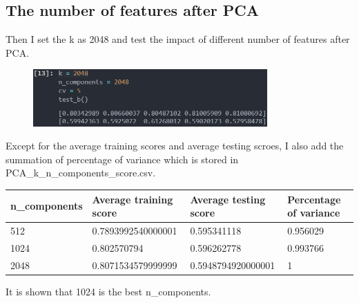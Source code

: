 \documentclass[UTF8, a4paper, 11pt]{article}
\begin{document}
\subsection{The number of features after PCA}
Then I set the k as 2048 and test the impact of different number of features after PCA.
\begin{figure}[H]
    \centering
    \includegraphics[width=0.8\textwidth]{n_components.png}
\end{figure}
Except for the average training scores and average testing scroes, I also add the summation of percentage of variance which is stored in PCA\_k\_n\_components\_score.csv.
\begin{table}[H]
    \center
\begin{tabular}{|l|l|l|l|}
\hline
n\_components & Average training score & Average testing score & Percentage of variance \\ \hline
512          & 0.7893992540000001     & 0.595341118           & 0.956029               \\ \hline
1024         & 0.802570794            & 0.596262778           & 0.993766               \\ \hline
2048         & 0.8071534579999999     & 0.5948794920000001    & 1                      \\ \hline
\end{tabular}
\end{table}
It is shown that 1024 is the best n\_components.
\end{document}
